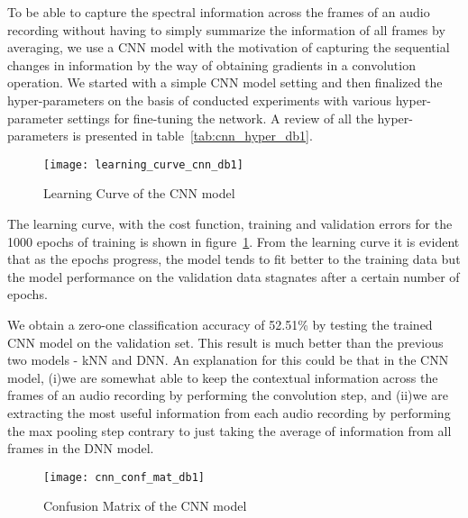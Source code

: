 To be able to capture the spectral information across the frames of an audio recording without having to simply summarize the information of all frames by averaging, we use a CNN model with the motivation of capturing the sequential changes in information by the way of obtaining gradients in a convolution operation. We started with a simple CNN model setting and then finalized the hyper-parameters on the basis of conducted experiments with various hyper-parameter settings for fine-tuning the network. A review of all the hyper-parameters is presented in table~\ref{tab:cnn_hyper_db1}.

\begin{figure}[!htb] 
\centering 
\texttt{[image: learning\_curve\_cnn\_db1]} 
\caption[Learning Curve CNN]{Learning Curve of the CNN model}
\label{fig:learning_curve_cnn_db1} 
\end{figure}

The learning curve, with the cost function, training and validation errors for the 1000 epochs of training is shown in figure~\ref{fig:learning_curve_cnn_db1}. From the learning curve it is evident that as the epochs progress, the model tends to fit better to the training data but the model performance on the validation data stagnates after a certain number of epochs.

We obtain a zero-one classification accuracy of 52.51\% by testing the trained CNN model on the validation set. This result is much better than the previous two models - kNN and DNN. An explanation for this could be that in the CNN model, (i)we are somewhat able to keep the contextual information across the frames of an audio recording by performing the convolution step, and (ii)we are extracting the most useful information from each audio recording by performing the max pooling step contrary to just taking the average of information from all frames in the DNN model. 

\begin{figure}[!htb] 
\centering 
\texttt{[image: cnn\_conf\_mat\_db1]} 
\caption[Confusion Matrix CNN]{Confusion Matrix of the CNN model}
\label{fig:cnn_conf_mat_db1} 
\end{figure}

